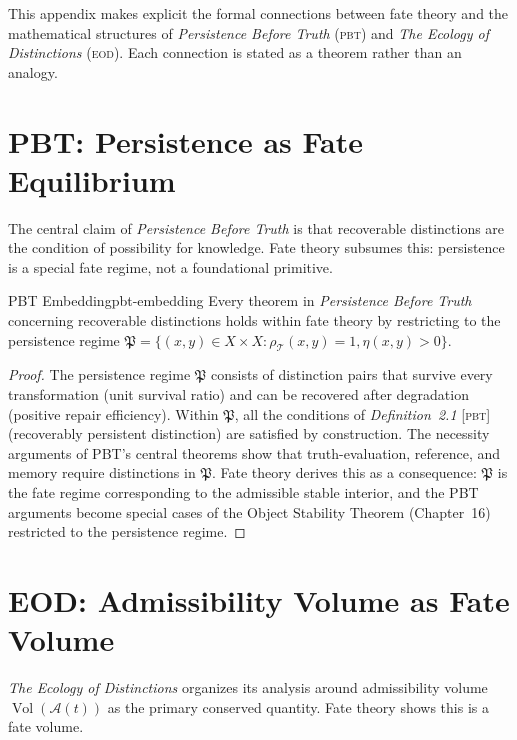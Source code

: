 \documentclass[12pt,twoside,openright]{book}
\newcommand{\adm}{\mathcal{A}}            %
\newcommand{\Vol}{\operatorname{Vol}}     %
\newcommand{\transfam}{\mathcal{T}}       %
\newcommand{\distPairs}{X\times X}
\newcommand{\survRatio}{\rho}             %
\newcommand{\repEff}{\eta}               %
\newcommand{\PBT}[1]{\textit{#1} [\textsc{pbt}]}
\providecommand{\persRegime}{\mathfrak{P}}
\begin{document}
This appendix makes explicit the formal connections between
fate theory and the mathematical structures of
\textit{Persistence Before Truth} (\textsc{pbt}) and
\textit{The Ecology of Distinctions} (\textsc{eod}).
Each connection is stated as a theorem rather than an analogy.

\section{PBT: Persistence as Fate Equilibrium}

The central claim of \textit{Persistence Before Truth} is
that recoverable distinctions are the condition of
possibility for knowledge. Fate theory subsumes this:
persistence is a special fate regime, not a foundational
primitive.

\begin{theorem}{PBT Embedding}{pbt-embedding}
Every theorem in \textit{Persistence Before Truth}
concerning recoverable distinctions holds within fate theory
by restricting to the persistence regime
$\persRegime=\{(x,y)\in\distPairs:\survRatio_\transfam(x,y)=1,
\repEff(x,y)>0\}$.
\begin{proof}
The persistence regime $\persRegime$ consists of distinction
pairs that survive every transformation (unit survival ratio)
and can be recovered after degradation (positive repair
efficiency). Within $\persRegime$, all the conditions of
\PBT{Definition~2.1} (recoverably persistent distinction)
are satisfied by construction. The necessity arguments of
PBT's central theorems show that truth-evaluation,
reference, and memory require distinctions in $\persRegime$.
Fate theory derives this as a consequence: $\persRegime$
is the fate regime corresponding to the admissible stable
interior, and the PBT arguments become special cases of
the Object Stability Theorem (Chapter~16) restricted to
the persistence regime.
\end{proof}
\end{theorem}

\section{EOD: Admissibility Volume as Fate Volume}

\textit{The Ecology of Distinctions} organizes its analysis
around admissibility volume $\Vol(\adm(t))$ as the primary
conserved quantity. Fate theory shows this is a fate volume.
\end{document}
